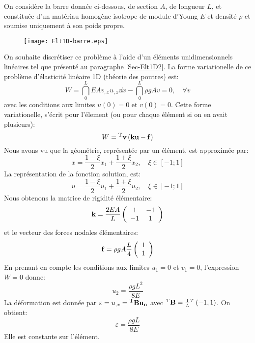 On considère la barre donnée ci-dessous, de section $A$, de longueur $L$, et constituée 
d'un matériau homogène isotrope de module d'Young 
$E$ et densité $\rho$ et soumise uniquement à son poids propre.\\
\begin{figure}[ht]
\centering
\texttt{[image: Elt1D-barre.eps]}
\end{figure}
On souhaite discrétiser ce problème à l'aide d'un éléments unidimensionnels linéaires
tel que présenté au paragraphe \ref{Sec-Elt1D2}.
\medskip
La forme variationelle de ce problème d'élasticité linéaire 1D (théorie des poutres) est:
\begin{equation}
W=\dint_0^L EA v_{,x}u_{,x} \dd x - \dint_0^L \rho g A v = 0, \quad \forall v
\end{equation}
avec les conditions aux limites $u(0)=0$ et $v(0)=0$.
Cette forme variationelle, s'écrit pour l'élement (ou pour chaque élément si on en avait plusieurs):
\begin{equation}
W = {}^\mathrm{T}\mathbf{v} \left( \mathbf{k}\mathbf{u} - \mathbf{f} \right)
\end{equation}
\medskip
Nous avons vu que la géométrie, représentée par un élément, est approximée par:
\begin{equation} x=\frac{1-\xi}2 x_1 + \frac{1+\xi}2 x_2, \quad \xi\in[-1;1] \end{equation}
La représentation de la fonction solution, est:
\begin{equation} u = \frac{1-\xi}2 u_1 + \frac{1+\xi}2 u_2, \quad \xi\in[-1;1] \end{equation}
\medskip
Nous obtenons la matrice de rigidité élémentaire:
\begin{equation} \mathbf{k} = \frac{2EA}L \left(  \begin{array}{cc} 1 & -1\\ -1& 1 \end{array}\right) \end{equation}
et le vecteur des forces nodales élémentaires:
\begin{equation}  \mathbf{f} = \rho g A \frac{L}4 \left(  \begin{array}{c} 1 \\1 \end{array}\right) \end{equation}
\medskip
En prenant en compte les conditions aux limites $u_1=0$ et $v_1=0$, l'expression $W=0$ donne:
\begin{equation} u_2 = \frac{\rho g L^2}{8 E} \end{equation}
\medskip
La déformation est donnée par $\varepsilon=u_{,x}={}^\mathrm{T}\mathbf{B}\mathbf{u_n}$ avec ${}^\mathrm{T}\mathbf{B}=\frac1L {}^T\left( -1, 1\right)$.
On obtient: \begin{equation}\varepsilon=\frac{\rho g L}{8 E}\end{equation} Elle est constante sur l'élément.

